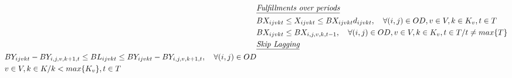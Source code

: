 \begin{align}
	 & \textit{\underline{Fulfillments over periods} }   \notag                                                                                                                                                                                                                                    \\
	 & BX_{ijvkt} \leq X_{ijvkt} \leq BX_{ijvkt}d_{ijvkt}, \quad   \forall(i,j) \in OD, v \in V, k \in K_v, t \in T                                                                                                  \label{eq: m1_binaria_BX}                                                                               \\
	 & BX_{ijvkt} \leq BX_{i,j,v,k,t-1}, \quad   \forall(i,j) \in OD, v \in V, k \in K_v, t \in T/ t \neq max\{T\}                                                                                                   \label{eq: m1_assig_last_periodo}                                                                              \\
	 & \textit{\underline{Skip Lagging}}    \notag                                                                                                                                                                                                                                                  \\
	\begin{split}
		 & BY_{ijvkt} - BY_{i,j,v,k+1,t} \leq BL_{ijvkt} \leq BY_{ijvkt} - BY_{i,j,v,k+1,t}, \quad \forall (i,j) \in OD                                                                                                                                                                         \\
		 & v \in V, k \in K /k < max\{K_v\}, t\in T                                                                                                                                                                                                                                                 \\
	\end{split}                                                                                                                                                                                                       \label{eq: m1_binaria_BL}                                                                               \\

\end{align}
